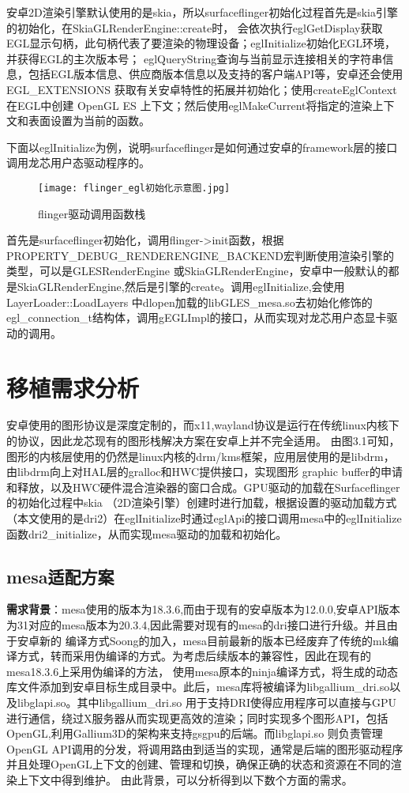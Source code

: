 安卓2D渲染引擎默认使用的是skia，所以surfaceflinger初始化过程首先是skia引擎的初始化，在SkiaGLRenderEngine::create时，
会依次执行eglGetDisplay获取EGL显示句柄，此句柄代表了要渲染的物理设备；eglInitialize初始化EGL环境，并获得EGL的主次版本号；
eglQueryString查询与当前显示连接相关的字符串信息，包括EGL版本信息、供应商版本信息以及支持的客户端API等，安卓还会使用EGL\_EXTENSIONS
获取有关安卓特性的拓展并初始化；使用createEglContext在EGL中创建 OpenGL ES 上下文；然后使用eglMakeCurrent将指定的渲染上下文和表面设置为当前的函数。

下面以eglInitialize为例，说明surfaceflinger是如何通过安卓的framework层的接口调用龙芯用户态驱动程序的。

\begin{figure}[h]
  \centering
  \texttt{[image: flinger\_egl初始化示意图.jpg]}
  \caption{flinger驱动调用函数栈}
\end{figure}

首先是surfaceflinger初始化，调用flinger->init函数，根据PROPERTY\_DEBUG\_RENDERENGINE\_BACKEND宏判断使用渲染引擎的类型，可以是GLESRenderEngine
或SkiaGLRenderEngine，安卓中一般默认的都是SkiaGLRenderEngine,然后是引擎的create。调用eglInitialize,会使用LayerLoader::LoadLayers
中dlopen加载的libGLES\_mesa.so去初始化修饰的egl\_connection\_t结构体，调用gEGLImpl的接口，从而实现对龙芯用户态显卡驱动的调用。

\section{移植需求分析}
安卓使用的图形协议是深度定制的，而x11,wayland协议是运行在传统linux内核下的协议，因此龙芯现有的图形栈解决方案在安卓上并不完全适用。
由图3.1可知，图形的内核层使用的仍然是linux内核的drm/kms框架，应用层使用的是libdrm，由libdrm向上对HAL层的gralloc和HWC提供接口，实现图形
graphic buffer的申请和释放，以及HWC硬件混合渲染器的窗口合成。GPU驱动的加载在Surfaceflinger的初始化过程中skia
（2D渲染引擎）创建时进行加载，根据设置的驱动加载方式（本文使用的是dri2）在eglInitialize时通过eglApi的接口调用mesa中的eglInitialize
函数dri2\_initialize，从而实现mesa驱动的加载和初始化。

\subsection{mesa适配方案}
\textbf{需求背景}：mesa使用的版本为18.3.6,而由于现有的安卓版本为12.0.0,安卓API版本为31对应的mesa版本为20.3.4,因此需要对现有的mesa的dri接口进行升级。并且由于安卓新的
编译方式Soong的加入，mesa目前最新的版本已经废弃了传统的mk编译方式，转而采用伪编译的方式。为考虑后续版本的兼容性，因此在现有的mesa18.3.6上采用伪编译的方法，
使用mesa原本的ninja编译方式，将生成的动态库文件添加到安卓目标生成目录中。此后，mesa库将被编译为libgallium\_dri.so以及libglapi.so。其中libgallium\_dri.so
用于支持DRI使得应用程序可以直接与GPU进行通信，绕过X服务器从而实现更高效的渲染；同时实现多个图形API，包括OpenGL,利用Gallium3D的架构来支持gsgpu的后端。而libglapi.so
则负责管理OpenGL API调用的分发，将调用路由到适当的实现，通常是后端的图形驱动程序并且处理OpenGL上下文的创建、管理和切换，确保正确的状态和资源在不同的渲染上下文中得到维护。
由此背景，可以分析得到以下数个方面的需求。

